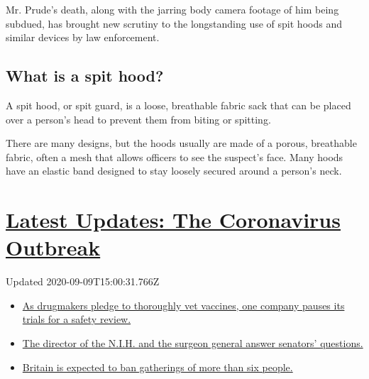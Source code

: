 Mr. Prude's death, along with the jarring body camera footage of him
being subdued, has brought new scrutiny to the longstanding use of spit
hoods and similar devices by law enforcement.

\hypertarget{what-is-a-spit-hood}{%
\subsection{What is a spit hood?}\label{what-is-a-spit-hood}}

A spit hood, or spit guard, is a loose, breathable fabric sack that can
be placed over a person's head to prevent them from biting or spitting.

There are many designs, but the hoods usually are made of a porous,
breathable fabric, often a mesh that allows officers to see the
suspect's face. Many hoods have an elastic band designed to stay loosely
secured around a person's neck.

\hypertarget{latest-updates-the-coronavirus-outbreak}{%
\section{\texorpdfstring{\href{https://www.nytimes3xbfgragh.onion/2020/09/09/world/covid-19-coronavirus.html?action=click\&pgtype=Article\&state=default\&region=MAIN_CONTENT_1\&context=storylines_live_updates}{Latest
Updates: The Coronavirus
Outbreak}}{Latest Updates: The Coronavirus Outbreak}}\label{latest-updates-the-coronavirus-outbreak}}

Updated 2020-09-09T15:00:31.766Z

\begin{itemize}
\tightlist
\item
  \href{https://www.nytimes3xbfgragh.onion/2020/09/09/world/covid-19-coronavirus.html?action=click\&pgtype=Article\&state=default\&region=MAIN_CONTENT_1\&context=storylines_live_updates\#link-5b0bf0d1}{As
  drugmakers pledge to thoroughly vet vaccines, one company pauses its
  trials for a safety review.}
\item
  \href{https://www.nytimes3xbfgragh.onion/2020/09/09/world/covid-19-coronavirus.html?action=click\&pgtype=Article\&state=default\&region=MAIN_CONTENT_1\&context=storylines_live_updates\#link-6e2052bd}{The
  director of the N.I.H. and the surgeon general answer senators'
  questions.}
\item
  \href{https://www.nytimes3xbfgragh.onion/2020/09/09/world/covid-19-coronavirus.html?action=click\&pgtype=Article\&state=default\&region=MAIN_CONTENT_1\&context=storylines_live_updates\#link-780eaa2f}{Britain
  is expected to ban gatherings of more than six people.}
\end{itemize}

